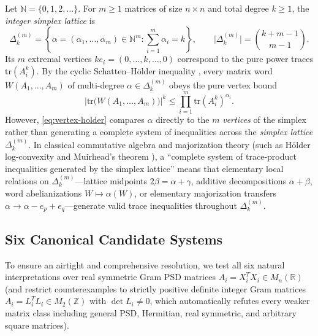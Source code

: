 \documentclass[11pt,a4paper]{article}
\theoremstyle{definition}
\theoremstyle{remark}
\newcommand{\tr}{\mathrm{tr}}
\newcommand{\DeltaLat}{\Delta}
\begin{document}
Let $\mathbb{N} = \{0,1,2,\dots\}$. For $m \ge 1$ matrices of size $n \times n$ and total degree $k \ge 1$, the \emph{integer simplex lattice} is
\[
\DeltaLat_k^{(m)} = \left\{ \alpha = (\alpha_1, \dots, \alpha_m) \in \mathbb{N}^m : \sum_{i=1}^m \alpha_i = k \right\},
\qquad \bigl|\DeltaLat_k^{(m)}\bigr| = \binom{k + m - 1}{m - 1}.
\]
Its $m$ extremal vertices $k e_i = (0,\dots,k,\dots,0)$ correspond to the pure power traces $\tr(A_i^k)$. By the cyclic Schatten--H\"older inequality \cite{Bhatia1997}, every matrix word $W(A_1,\dots,A_m)$ of multi-degree $\alpha \in \DeltaLat_k^{(m)}$ obeys the pure vertex bound
\begin{equation}\label{eq:vertex-holder}
\bigl|\tr\bigl(W(A_1,\dots,A_m)\bigr)\bigr|^k \le \prod_{i=1}^m \tr(A_i^k)^{\alpha_i}.
\end{equation}
However, \eqref{eq:vertex-holder} compares $\alpha$ directly to the $m$ \emph{vertices} of the simplex rather than generating a complete system of inequalities across the \emph{simplex lattice} $\DeltaLat_k^{(m)}$. In classical commutative algebra and majorization theory (such as H\"older log-convexity and Muirhead's theorem \cite{Muirhead1903,MarshallOlkinArnold2011}), a ``complete system of trace-product inequalities generated by the simplex lattice'' means that elementary local relations on $\DeltaLat_k^{(m)}$---lattice midpoints $2\beta = \alpha + \gamma$, additive decompositions $\alpha + \beta$, word abelianizations $W \mapsto \alpha(W)$, or elementary majorization transfers $\alpha \to \alpha - e_p + e_q$---generate valid trace inequalities throughout $\DeltaLat_k^{(m)}$.

\subsection{Six Canonical Candidate Systems}

To ensure an airtight and comprehensive resolution, we test all six natural interpretations over real symmetric Gram PSD matrices $A_i = X_i^T X_i \in M_n(\mathbb{R})$ (and restrict counterexamples to strictly positive definite integer Gram matrices $A_i = L_i^T L_i \in M_2(\mathbb{Z})$ with $\det L_i \ne 0$, which automatically refutes every weaker matrix class including general PSD, Hermitian, real symmetric, and arbitrary square matrices).
\end{document}
